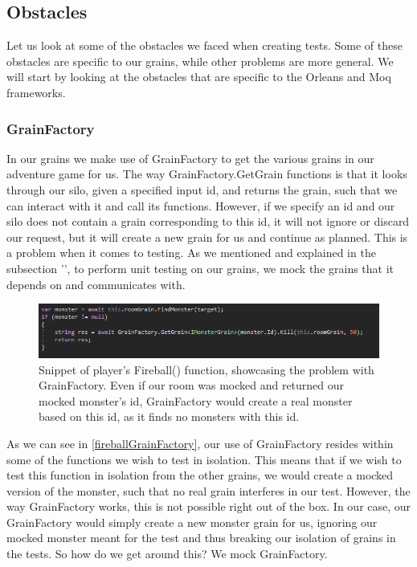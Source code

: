 \subsection{Obstacles}
Let us look at some of the obstacles we faced when creating tests. Some of these obstacles are specific to our grains, while other problems are more general. We will start by looking at the obstacles that are specific to the Orleans and Moq frameworks.
\subsubsection{GrainFactory} \label{GrainFactorySection}
In our grains we make use of GrainFactory to get the various grains in our adventure game for us. The way GrainFactory.GetGrain functions is that it looks through our silo, given a specified input id, and returns the grain, such that we can interact with it and call its functions. However, if we specify an id and our silo does not contain a grain corresponding to this id, it will not ignore or discard our request, but it will create a new grain for us and continue as planned. This is a problem when it comes to testing. As we mentioned and explained in the subsection '', to perform unit testing on our grains, we mock the grains that it depends on and communicates with. 
\begin{figure}[h]
    \centering
    \includegraphics[width=\linewidth]{Materials/TestingTheory/FireballGrainFactory}
    \caption{Snippet of player's Fireball() function, showcasing the problem with GrainFactory. Even if our room was mocked and returned our mocked monster's id, GrainFactory would create a real monster based on this id, as it finds no monsters with this id.}
    \label{fireballGrainFactory}
\end{figure}
As we can see in \autoref{fireballGrainFactory}, our use of GrainFactory resides within some of the functions we wish to test in isolation. This means that if we wish to test this function in isolation from the other grains, we would create a mocked version of the monster, such that no real grain interferes in our test. However, the way GrainFactory works, this is not possible right out of the box. In our case, our GrainFactory would simply create a new monster grain for us, ignoring our mocked monster meant for the test and thus breaking our isolation of grains in the tests. So how do we get around this? We mock GrainFactory. \\

